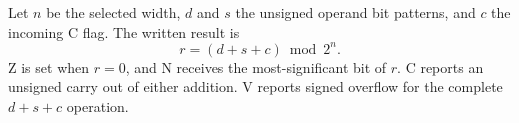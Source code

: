 Let \(n\) be the selected width, \(d\) and \(s\) the unsigned operand bit patterns, and \(c\) the incoming C flag. The written result is
\[
  r = (d + s + c) \bmod 2^n .
\]
Z is set when \(r=0\), and N receives the most-significant bit of \(r\). C reports an unsigned carry out of either addition. V reports signed overflow for the complete \(d+s+c\) operation.
